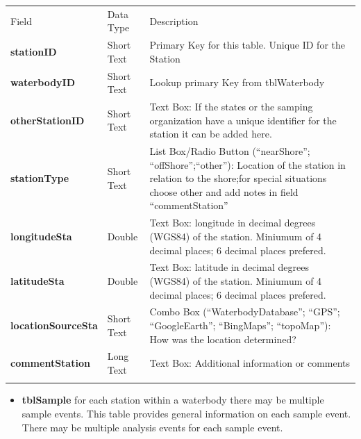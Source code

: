 \documentclass[]{article}
\begin{document}
\begin{longtable}[c]{@{}lll@{}}
\toprule\addlinespace
Field & Data Type & Description
\\\addlinespace
\midrule\endhead
\textbf{stationID} & Short Text & Primary Key for this table. Unique ID
for the Station
\\\addlinespace
\textbf{waterbodyID} & Short Text & Lookup primary Key from tblWaterbody
\\\addlinespace
\textbf{otherStationID} & Short Text & Text Box: If the states or the
samping organization have a unique identifier for the station it can be
added here.
\\\addlinespace
\textbf{stationType} & Short Text & List Box/Radio Button
(``nearShore''; ``offShore'';``other''): Location of the station in
relation to the shore;for special situations choose other and add notes
in field ``commentStation''
\\\addlinespace
\textbf{longitudeSta} & Double & Text Box: longitude in decimal degrees
(WGS84) of the station. Miniumum of 4 decimal places; 6 decimal places
prefered.
\\\addlinespace
\textbf{latitudeSta} & Double & Text Box: latitude in decimal degrees
(WGS84) of the station. Miniumum of 4 decimal places; 6 decimal places
prefered.
\\\addlinespace
\textbf{locationSourceSta} & Short Text & Combo Box
(``WaterbodyDatabase''; ``GPS''; ``GoogleEarth''; ``BingMaps'';
``topoMap''): How was the location determined?
\\\addlinespace
\textbf{commentStation} & Long Text & Text Box: Additional information
or comments
\\\addlinespace
\bottomrule
\end{longtable}

\begin{itemize}
\itemsep1pt\parskip0pt
\item
  \textbf{tblSample} for each station within a waterbody there may be
  multiple sample events. This table provides general information on
  each sample event. There may be multiple analysis events for each
  sample event.
\end{itemize}
\end{document}
